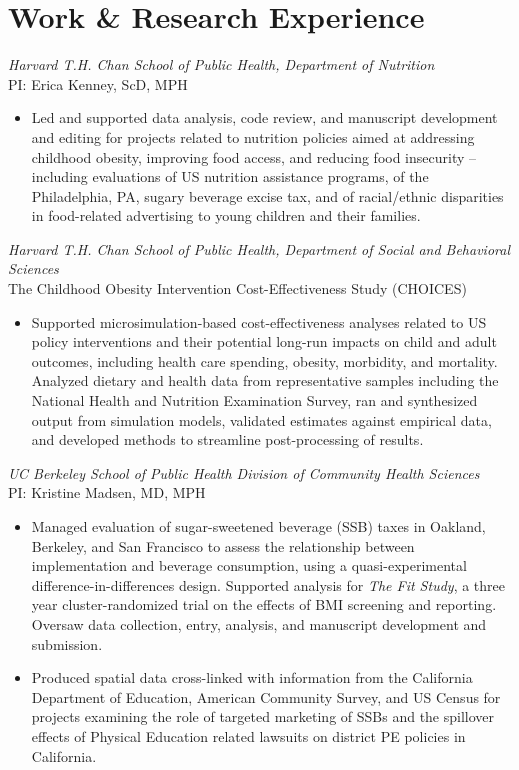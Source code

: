 \documentclass{cv_style}
\begin{document}
\section{Work \& Research Experience}

\textit{Harvard T.H. Chan School of Public Health, Department of Nutrition} \\
PI: Erica Kenney, ScD, MPH
\begin{itemize}
    \item Led and supported data analysis, code review, and manuscript development and editing for projects related to nutrition policies aimed at addressing childhood obesity, improving food access, and reducing food insecurity -- including evaluations of US nutrition assistance programs, of the Philadelphia, PA, sugary beverage excise tax, and of racial/ethnic disparities in food-related advertising to young children and their families.
\end{itemize}

\textit{Harvard T.H. Chan School of Public Health, Department of Social and Behavioral Sciences} \\
The Childhood Obesity Intervention Cost-Effectiveness Study (CHOICES)
\begin{itemize}
    \item Supported microsimulation-based cost-effectiveness analyses related to US policy interventions and their potential long-run impacts on child and adult outcomes, including health care spending, obesity, morbidity, and mortality. Analyzed dietary and health data from representative samples including the National Health and Nutrition Examination Survey, ran and synthesized output from simulation models, validated estimates against empirical data, and developed methods to streamline post-processing of results.
\end{itemize}

\textit{UC Berkeley School of Public Health Division of Community Health Sciences} \\
PI: Kristine Madsen, MD, MPH
\begin{itemize}
    \item Managed evaluation of sugar-sweetened beverage (SSB) taxes in Oakland, Berkeley, and San Francisco to assess the relationship between implementation and beverage consumption, using a quasi-experimental difference-in-differences design. Supported analysis for \textit{The Fit Study}, a three year cluster-randomized trial on the effects of BMI screening and reporting. Oversaw data collection, entry, analysis, and manuscript development and submission.
    \item \parskip 1pt Produced spatial data cross-linked with information from the California Department of Education, American Community Survey, and US Census for projects examining the role of targeted marketing of SSBs and the spillover effects of Physical Education related lawsuits on district PE policies in California.
\end{itemize}
\end{document}
